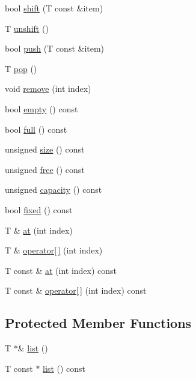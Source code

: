 \begin{DoxyCompactItemize}
bool \hyperlink{classVector_adb54584983bf6750f60d5ad375f6c603}{shift} (T const \&item)
\item 
T \hyperlink{classVector_a4fda2f9168cac24815062130bada9a8d}{unshift} ()
\item 
bool \hyperlink{classVector_ad15116a272b1924dc11e3543a8fc95d8}{push} (T const \&item)
\item 
T \hyperlink{classVector_aef4a3e10a9844ea17cdd89cee17e495a}{pop} ()
\item 
void \hyperlink{classVector_abc1ce95078c61fd5826583b0de7279b4}{remove} (int index)
\item 
bool \hyperlink{classVector_ad688a8a0dfbd07ea63d838058a436f79}{empty} () const
\item 
bool \hyperlink{classVector_a31a67e97a324510bff15ea79c64839af}{full} () const
\item 
unsigned \hyperlink{classVector_a7eef7a769093f4486f3b2083436bf270}{size} () const
\item 
unsigned \hyperlink{classVector_a1c11aef701f6eb3194946594d064af09}{free} () const
\item 
unsigned \hyperlink{classVector_a30435b1635ae160705f53755d25a407b}{capacity} () const
\item 
bool \hyperlink{classVector_ada65b076d4102d21479cdb00fec6b6a1}{fixed} () const
\item 
T \& \hyperlink{classVector_a0a53d8de64ae7cc1e388df4e46ab06bf}{at} (int index)
\item 
T \& \hyperlink{classVector_a2054758707c08325ef160fd4dfc48ff7}{operator\mbox{[}$\,$\mbox{]}} (int index)
\item 
T const  \& \hyperlink{classVector_a2539a2d9ca64fd4e400d1bdc23dc292c}{at} (int index) const
\item 
T const  \& \hyperlink{classVector_a491327d90df15af7ee79c6705f005491}{operator\mbox{[}$\,$\mbox{]}} (int index) const
\end{DoxyCompactItemize}
\subsection*{Protected Member Functions}
\begin{DoxyCompactItemize}
\item 
T $\ast$\& \hyperlink{classVector_aad3f85e26470d99139e3f96053bdacc4}{list} ()
\item 
T const  $\ast$ \hyperlink{classVector_a2aaf129778179680e5932d96aa5471eb}{list} () const
\end{DoxyCompactItemize}
